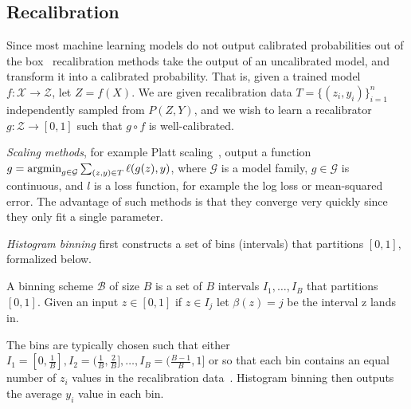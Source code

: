 \subsection{Recalibration}

Since most machine learning models do not output calibrated probabilities out of the box~\cite{guo2017calibration, zadrozny2001calibrated} recalibration methods take the output of an uncalibrated model, and transform it into a calibrated probability. That is, given a trained model $f: \mathcal{X} \to \mathcal{Z}$, let $Z = f(X)$. We are given recalibration data $T = \{ (z_i, y_i) \}_{i=1}^n$ independently sampled from $P(Z, Y)$, and we wish to learn a recalibrator $g : \mathcal{Z} \to [0, 1]$ such that $g \circ f$ is well-calibrated.

\emph{Scaling methods}, for example Platt scaling~\cite{platt1999probabilistic}, output a function $g = \mathop{\mbox{argmin}}_{g \in \mathcal{G}} \sum_{(z, y) \in T} \ell(g(z), y)$, where $\mathcal{G}$ is a model family, $g \in \mathcal{G}$ is continuous, and $l$ is a loss function, for example the log loss or mean-squared error. The advantage of such methods is that they converge very quickly since they only fit a single parameter.

\emph{Histogram binning} first constructs a set of bins (intervals) that partitions $[0, 1]$, formalized below.

\begin{definition}
A binning scheme $\mathcal{B}$ of size $B$ is a set of $B$ intervals $I_1, \dots, I_B$ that partitions $[0, 1]$. Given an input $z \in [0, 1]$ if $z \in I_j$ let $\beta(z) = j$ be the interval z lands in.
\end{definition}

The bins are typically chosen such that either $I_1 = [0, \frac{1}{B}], I_2 = (\frac{1}{B}, \frac{2}{B}], \dots, I_B = (\frac{B-1}{B}, 1]$ or so that each bin contains an equal number of $z_i$ values in the recalibration data~\cite{zadrozny2001calibrated, guo2017calibration}. Histogram binning then outputs the average $y_i$ value in each bin.
